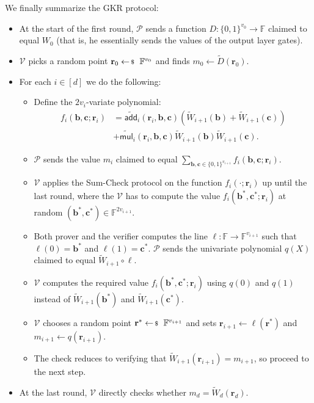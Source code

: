 \begin{proposition}
We finally summarize the GKR protocol:
\begin{itemize}
    \item At the start of the first round, $\mathcal{P}$ sends a function 
    $D: \{0,1\}^{v_0} \to \mathbb{F}$ claimed to equal $W_0$ (that is, he 
    essentially sends the values of the output layer gates).
    \item $\mathcal{V}$ picks a random point $\mathbf{r}_0 \leftarrowS
    \mathbb{F}^{v_0}$ and finds $m_0 \gets \widetilde{D}(\mathbf{r}_0)$.
    \item For each $i \in [d]$ we do the following:
    \begin{itemize}
        \item Define the $2v_i$-variate polynomial:
        \begin{align*}
            f_i(\boldsymbol{b}, \boldsymbol{c}; \mathbf{r}_i) &= \widetilde{\mathsf{add}}_i(\mathbf{r}_i, \boldsymbol{b}, \boldsymbol{c})(\widetilde{W}_{i+1}(\boldsymbol{b}) + \widetilde{W}_{i+1}(\boldsymbol{c})) \\
            &+ \widetilde{\mathsf{mul}}_i(\mathbf{r}_i, \boldsymbol{b}, \boldsymbol{c})\widetilde{W}_{i+1}(\boldsymbol{b})\widetilde{W}_{i+1}(\boldsymbol{c}).
        \end{align*}
        \item $\mathcal{P}$ sends the value $m_i$ claimed to equal
        $\sum_{\boldsymbol{b}, \boldsymbol{c} \in
        \{0,1\}^{v_{i+1}}}f_i(\boldsymbol{b}, \boldsymbol{c}; \mathbf{r}_i)$.
        \item $\mathcal{V}$ applies the Sum-Check protocol on the function
        $f_i(\cdot; \mathbf{r}_i)$ up until the last round, where the
        $\mathcal{V}$ has to compute the value $f_i(\boldsymbol{b}^*,
        \boldsymbol{c}^*; \mathbf{r}_i)$ at random $(\boldsymbol{b}^*,
        \boldsymbol{c}^*) \in \mathbb{F}^{2v_{i+1}}$.
        \item Both prover and the verifier computes the line $\ell: \mathbb{F} \to
        \mathbb{F}^{v_{i+1}}$ such that $\ell(0)=\boldsymbol{b}^*$ and
        $\ell(1)=\boldsymbol{c}^*$. $\mathcal{P}$ sends the univariate
        polynomial $q(X)$ claimed to equal $\widetilde{W}_{i+1} \circ \ell$.
        \item $\mathcal{V}$ computes the required value $f_i(\boldsymbol{b}^*,
        \boldsymbol{c}^*; \mathbf{r}_i)$ using $q(0)$ and $q(1)$ instead of 
        $\widetilde{W}_{i+1}(\boldsymbol{b}^*)$ and $\widetilde{W}_{i+1}(\boldsymbol{c}^*)$.
        \item $\mathcal{V}$ chooses a random point $\mathbf{r}^* \leftarrowS
        \mathbb{F}^{v_{i+1}}$ and sets $\mathbf{r}_{i+1} \gets
        \ell(\mathbf{r}^*)$ and $m_{i+1} \gets q(\mathbf{r}_{i+1})$.
        \item The check reduces to verifying that
        $\widetilde{W}_{i+1}(\mathbf{r}_{i+1}) = m_{i+1}$, so proceed to the
        next step.
    \end{itemize}
    \item At the last round, $\mathcal{V}$ directly checks whether
    $m_d=\widetilde{W}_d(\mathbf{r}_d)$.
\end{itemize}
\end{proposition}
